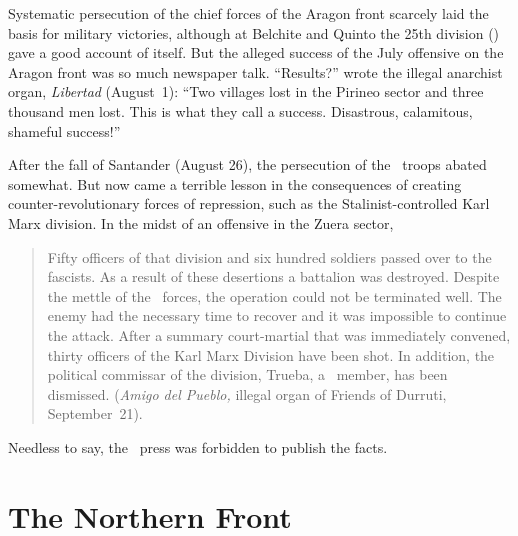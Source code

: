 \vspace{-0.33\baselineskip}

\indexLibertad{}
Systematic persecution of the chief forces of the Aragon front scarcely laid the basis for military victories, although at Belchite and Quinto the 25th division (\CNT) gave a good account of itself. But the alleged success of the July offensive on the Aragon front was so much newspaper talk. ``Results?'' wrote the illegal anarchist organ, \emph{Libertad} (August~1): ``Two villages lost in the Pirineo sector and three thousand men lost. This is what they call a success. Disastrous, calamitous, shameful success!''

After the fall of Santander (August 26), the persecution of the \CNT\ troops abated somewhat. But now came a terrible lesson in the consequences of creating counter-revolutionary forces of repression, such as the Stalinist-controlled Karl Marx division. In the midst of an offensive in the Zuera sector,

\vspace{-0.33\baselineskip}

\indexCNT\indexPSUC{}
\begin{quotation}
  Fifty officers of that division and six hundred soldiers pass\-ed over to the fascists. As a result of these desertions a battalion was destroyed. Despite the mettle of the \CNT\ forces, the operation could not be terminated well. The enemy had the necessary time to recover and it was impossible to continue the attack. After a summary court-martial that was immediately convened, thirty officers of the Karl Marx Division have been shot. In addition, the political commissar of the division, Trueba, a \PSUC\ member, has been dismissed. (\emph{Amigo del Pueblo,} illegal organ of Friends of Durruti, September~21).
\end{quotation}

\vspace{-0.33\baselineskip}

Needless to say, the \CNT\ press was forbidden to publish the facts.

\section{The Northern Front}




